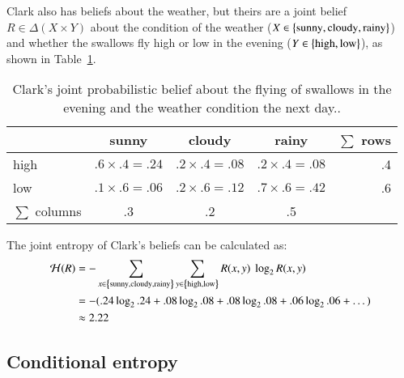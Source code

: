 \documentclass[nobib,nofonts]{tufte-handout}
\begin{document}
\begin{example}

Clark also has beliefs about the weather, but theirs are a joint belief $R \in \Delta(X \times Y)$ about the condition of the weather ($X \in \left\{\text{sunny}, \text{cloudy}, \text{rainy}\right\} $) and whether the swallows fly high or low in the evening ($Y \in \left\{\text{high}, \text{low}\right\}$), as shown in Table~\ref{tab:joint-prob-Clark}.

  \begin{table}

    \begin{tabular}{lcccr}
           & sunny                 & cloudy                & rainy                 & $\sum$ rows \\ \midrule
      high & $.6 \times .4 = .24$ & $.2 \times .4 = .08$ & $.2 \times .4 = .08$ & .4 \\
      low  & $.1 \times .6 = .06$ & $.2 \times .6 = .12$ & $.7 \times .6 = .42$ & .6 \\ \midrule
      $\sum$ columns & .3 & .2 & .5
    \end{tabular}

  \caption{Clark's joint probabilistic belief about the flying of swallows in the evening and the weather condition the next day..}
  \label{tab:joint-prob-Clark}

\end{table}

\medskip

  The joint entropy of Clark's beliefs can be calculated as:
  \begin{align*}
    \mathcal{H}(R) & = - \sum_{x \in \left\{\text{sunny}, \text{cloudy}, \text{rainy}\right\}} \sum_{y \in \left\{\text{high}, \text{low}\right\}} R(x,y) \ \log_{2} R(x,y) \\
                   & = - (.24 \log_{2} .24  +
                     .08 \log_{2} .08  +
                     .08 \log_{2} .08  +
                     .06 \log_{2} .06  +
                     \dots
                     ) \\
    & \approx 2.22
  \end{align*}


\end{example}

\subsection{Conditional entropy}
\end{document}
